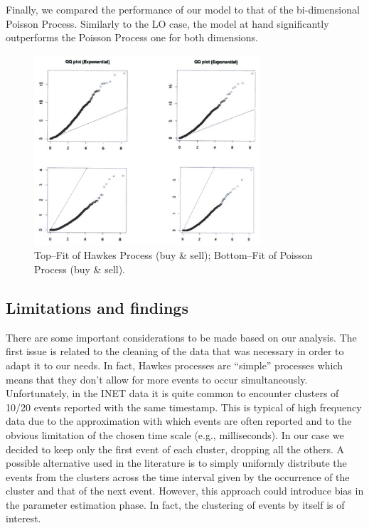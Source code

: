 Finally, we compared the performance of our model to that of the bi-dimensional Poisson Process. Similarly to the LO case, the model at hand significantly outperforms the Poisson Process one for both dimensions. 
	\begin{figure}[!ht]
   	\centering
   	\includegraphics[width=0.75\textwidth]{chapters/chapter_el_exch/figures/4fig.png} 
   	\caption{Top--Fit of Hawkes Process (buy \& sell); Bottom--Fit of Poisson Process (buy \& sell). \label{fig:4fig6}}
	\end{figure}


\subsection{Limitations and findings}


There are some important considerations to be made based on our analysis. The first issue is related to the cleaning of the data that was necessary in order to adapt it to our needs. In fact, Hawkes processes are ``simple'' processes which means that they don't allow for more events to occur simultaneously. Unfortunately, in the INET data it is quite common to encounter clusters of 10/20 events reported with the same timestamp. This is typical of high frequency data due to the approximation with which events are often reported and to the obvious limitation of the chosen time scale (e.g., milliseconds). In our case we decided to keep only the first event of each cluster, dropping all the others. A possible alternative used in the literature is to simply uniformly distribute the events from the clusters across the time interval given by the occurrence of the cluster and that of the next event. However, this approach could introduce bias in the parameter estimation phase. In fact, the clustering of events by itself is of interest.


